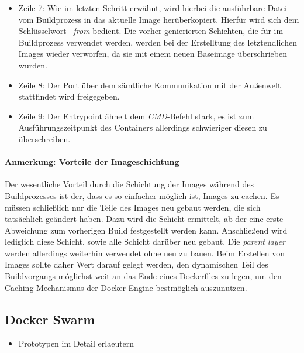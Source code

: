 \begin{itemize}
  \item Zeile 7: Wie im letzten Schritt erwähnt, wird hierbei die ausführbare Datei vom Buildprozess in das aktuelle Image herüberkopiert. Hierfür wird sich dem Schlüsselwort \emph{--from} bedient. Die vorher genierierten Schichten, die für im Buildprozess verwendet werden, werden bei der Erstelltung des letztendlichen Images wieder verworfen, da sie mit einem neuen Baseimage überschrieben wurden.
  \item Zeile 8: Der Port über dem sämtliche Kommunikation mit der Außenwelt stattfindet wird freigegeben. 
  \item Zeile 9: Der Entrypoint ähnelt dem \emph{CMD}-Befehl stark, es ist zum Ausführungszeitpunkt des Containers allerdings schwieriger diesen zu überschreiben.
\end{itemize}


\paragraph{Anmerkung: Vorteile der Imageschichtung} Der wesentliche Vorteil durch die Schichtung der Images während des Buildprozesses ist der, dass es so einfacher möglich ist, Images zu cachen. Es müssen schließlich nur die Teile des Images neu gebaut werden, die sich tatsächlich geändert haben. Dazu wird die Schicht ermittelt, ab der eine erste Abweichung zum vorherigen Build festgestellt werden kann. Anschließend wird lediglich diese Schicht, sowie alle Schicht darüber neu gebaut. Die \emph{parent layer} werden allerdings weiterhin verwendet ohne neu zu bauen. Beim Erstellen von Images sollte daher Wert darauf gelegt werden, den dynamischen Teil des Buildvorgangs móglichst weit an das Ende eines Dockerfiles zu legen, um den Caching-Mechanismus der Docker-Engine bestmöglich auszunutzen.


\subsection{Docker Swarm}

\begin{itemize}
  \item Prototypen im Detail erlaeutern
\end{itemize}


